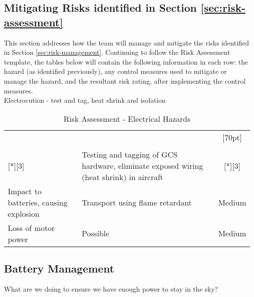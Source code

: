 \label{sec:risk-management}
\subsection{Mitigating Risks identified in Section \ref{sec:risk-assessment}}
This section addresses how the team will manage and mitigate the risks identified in Section \ref{sec:risk-management}. Continuing to follow the Risk Assessment template, the tables below will contain the following information in each row: the hazard (as identified previously), any control measures used to mitigate or manage the hazard, and the resultant risk rating, after implementing the control measures.\\

Electrocution - test and tag, heat shrink and isolation

\begin{table}[!h]
	\label{tab:management-electrical}
	\centering
	\begin{tabularx}{\textwidth}{|Y|Y|c|}
		\hline		
		 &  & \\
		& & \\
		\hline
		 & Testing and tagging of GCS hardware, eliminate exposed wiring (heat shrink) in aircraft & \\
		\hline
		Impact to batteries, causing explosion & Transport using flame retardant  & Medium\\
		\hline
		Loss of motor power & Possible & Medium\\		
		\hline
	\end{tabularx} 
	\caption{Risk Assessment - Electrical Hazards}
\end{table}

\subsection{Battery Management}
What are we doing to ensure we have enough power to stay in the sky?